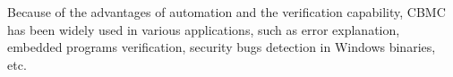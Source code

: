 Because of the advantages of automation and the verification capability, CBMC has been widely used in various applications, such as error explanation, embedded programs verification, security bugs detection in Windows binaries, etc.



